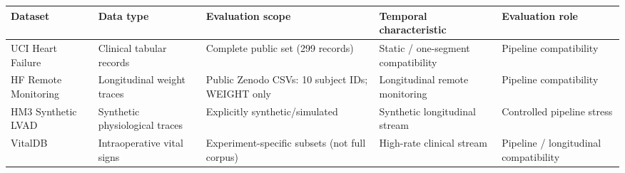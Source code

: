 \begin{tabular}{|l|l|l|l|l|}
\hline
\textbf{Dataset} & \textbf{Data type} & \textbf{Evaluation scope} & \textbf{Temporal characteristic} & \textbf{Evaluation role} \\
\hline
UCI Heart Failure & Clinical tabular records & Complete public set (299 records) & Static / one-segment compatibility & Pipeline compatibility \\
\hline
HF Remote Monitoring & Longitudinal weight traces & Public Zenodo CSVs: 10 subject IDs; WEIGHT only & Longitudinal remote monitoring & Pipeline compatibility \\
\hline
HM3 Synthetic LVAD & Synthetic physiological traces & Explicitly synthetic/simulated & Synthetic longitudinal stream & Controlled pipeline stress \\
\hline
VitalDB & Intraoperative vital signs & Experiment-specific subsets (not full corpus) & High-rate clinical stream & Pipeline / longitudinal compatibility \\
\hline
\end{tabular}
